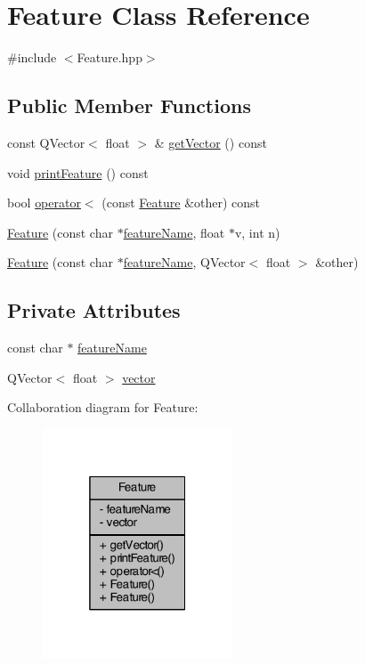 \hypertarget{class_feature}{\section{Feature Class Reference}
\label{class_feature}
}


{\ttfamily \#include $<$Feature.\+hpp$>$}

\subsection*{Public Member Functions}
\begin{DoxyCompactItemize}
\item 
const Q\+Vector$<$ float $>$ \& \hyperlink{class_feature_ab96106b9d1ba89cfa00ffb63a26b2130}{get\+Vector} () const 
\item 
void \hyperlink{class_feature_a0e73c5cb157120a30704efb4af866ec0}{print\+Feature} () const 
\item 
bool \hyperlink{class_feature_a46b25bf3494c10b1d130911f07f1a046}{operator$<$} (const \hyperlink{class_feature}{Feature} \&other) const 
\item 
\hyperlink{class_feature_a71a84ccca45918ac2019cc2c69fa0e13}{Feature} (const char $\ast$\hyperlink{class_feature_aaeb59834a8cafa7a89fc7a02f861f37d}{feature\+Name}, float $\ast$v, int n)
\item 
\hyperlink{class_feature_a52ff10b6dc6cb67d722289b7b4354924}{Feature} (const char $\ast$\hyperlink{class_feature_aaeb59834a8cafa7a89fc7a02f861f37d}{feature\+Name}, Q\+Vector$<$ float $>$ \&other)
\end{DoxyCompactItemize}
\subsection*{Private Attributes}
\begin{DoxyCompactItemize}
\item 
const char $\ast$ \hyperlink{class_feature_aaeb59834a8cafa7a89fc7a02f861f37d}{feature\+Name}
\item 
Q\+Vector$<$ float $>$ \hyperlink{class_feature_a8158dfca752942aeb84f35c363184d95}{vector}
\end{DoxyCompactItemize}


Collaboration diagram for Feature\+:\nopagebreak
\begin{figure}[H]
\begin{center}
\leavevmode
\includegraphics[width=160pt]{class_feature__coll__graph}
\end{center}
\end{figure}


